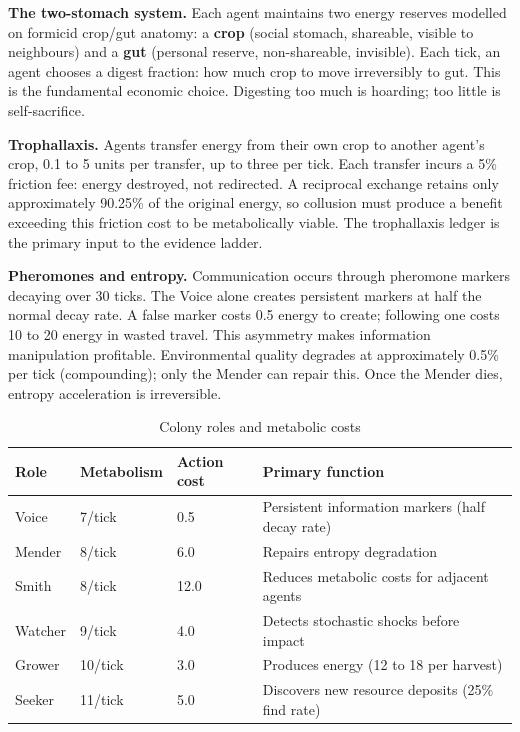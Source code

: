 \documentclass[10pt,a4paper]{article}
\begin{document}
\textbf{The two-stomach system.} Each agent maintains two energy reserves modelled on formicid crop/gut anatomy: a \textbf{crop} (social stomach, shareable, visible to neighbours) and a \textbf{gut} (personal reserve, non-shareable, invisible). Each tick, an agent chooses a digest fraction: how much crop to move irreversibly to gut. This is the fundamental economic choice. Digesting too much is hoarding; too little is self-sacrifice.

\textbf{Trophallaxis.} Agents transfer energy from their own crop to another agent's crop, 0.1 to 5 units per transfer, up to three per tick. Each transfer incurs a 5\% friction fee: energy destroyed, not redirected. A reciprocal exchange retains only approximately 90.25\% of the original energy, so collusion must produce a benefit exceeding this friction cost to be metabolically viable. The trophallaxis ledger is the primary input to the evidence ladder.

\textbf{Pheromones and entropy.} Communication occurs through pheromone markers decaying over 30 ticks. The Voice alone creates persistent markers at half the normal decay rate. A false marker costs 0.5 energy to create; following one costs 10 to 20 energy in wasted travel. This asymmetry makes information manipulation profitable. Environmental quality degrades at approximately 0.5\% per tick (compounding); only the Mender can repair this. Once the Mender dies, entropy acceleration is irreversible.

\begin{table}[H]
\centering\small
\caption{Colony roles and metabolic costs}
\begin{tabular}{llll}
\hline
Role & Metabolism & Action cost & Primary function \\
\hline
Voice & 7/tick & 0.5 & Persistent information markers (half decay rate) \\
Mender & 8/tick & 6.0 & Repairs entropy degradation \\
Smith & 8/tick & 12.0 & Reduces metabolic costs for adjacent agents \\
Watcher & 9/tick & 4.0 & Detects stochastic shocks before impact \\
Grower & 10/tick & 3.0 & Produces energy (12 to 18 per harvest) \\
Seeker & 11/tick & 5.0 & Discovers new resource deposits (25\% find rate) \\
\hline
\end{tabular}
\end{table}
\end{document}
